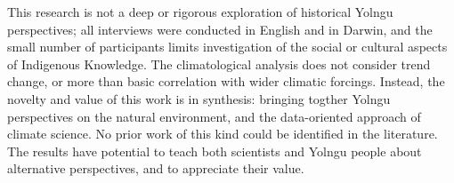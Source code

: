 This research is not a deep or rigorous exploration of historical Yolngu
perspectives; all interviews were conducted in English and in Darwin, and
the small number of participants limits investigation of the social or
cultural aspects of Indigenous Knowledge.  The climatological analysis
does not consider trend change, or more than basic correlation with
wider climatic forcings.
%
Instead, the novelty and value of this work is in synthesis: bringing
togther Yolngu perspectives on the natural environment, and the
data-oriented approach of climate science.  No prior work of this kind
could be identified in the literature.  The results have potential to
teach both scientists and Yolngu people about alternative perspectives,
and to appreciate their value.

